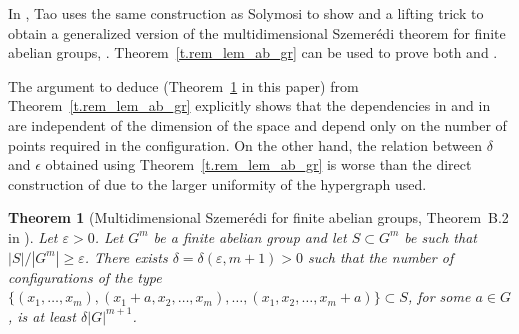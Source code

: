 \documentclass[10pt]{article}
\newtheorem{theorem}{Theorem}
\begin{document}
In \cite{tao12}, Tao uses the same construction as Solymosi \cite{sol04} to show \cite[Theorem~B.2]{tao12} and a lifting trick to obtain a generalized version of the multidimensional Szemer\'edi theorem for finite abelian groups, \cite[Theorem~B.1]{tao12}.
 Theorem~\ref{t.rem_lem_ab_gr} can be used to prove both \cite[Theorem~B.1]{tao12} and \cite[Theorem~B.2]{tao12}. 

The argument to deduce \cite[Theorem~B.2]{tao12} (Theorem~\ref{t.multi_szem_ab_gr} in this paper) from Theorem~\ref{t.rem_lem_ab_gr} explicitly shows that the dependencies in \cite[Theorem~B.2]{tao12} and in \cite[Theorem~B.1]{tao12} are independent of the dimension of the space and depend only on the number of points required in the configuration. On the other hand, the relation between $\delta$ and $\epsilon$ obtained using Theorem~\ref{t.rem_lem_ab_gr} is worse than the direct construction of \cite[Theorem~B.2]{tao12} due to the larger uniformity of the hypergraph used.





\begin{theorem}[Multidimensional Szemer\'edi for finite abelian groups, Theorem~B.2 in \cite{tao12}] \label{t.multi_szem_ab_gr}
	Let $\varepsilon >0$. Let $G^m$ be a finite abelian group and let
	$S\subset G^m$ be such that $|S|/|G^m|\geq \varepsilon$. There exists $\delta=\delta(\varepsilon,m+1)>0$ such that the number of configurations of the type
	$\{(x_1,\ldots,x_m),(x_1+a,x_2,\ldots,x_m),\ldots,(x_1,x_2,\ldots,x_m+a)\}\subset S$, for some $a\in G$, is at least $\delta |G|^{m+1}$.
\end{theorem}
\end{document}
